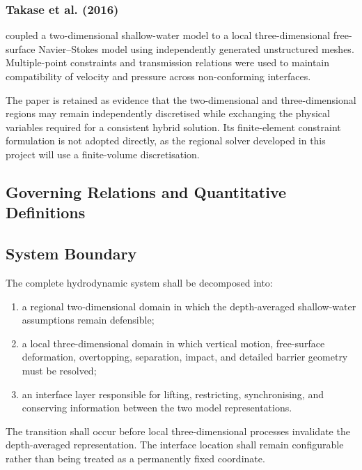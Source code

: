 \subsubsection{Takase et al. (2016)}
\label{sec:res-mod-mul-evidence-takase-2016}

\textcite{takase2016hybrid} coupled a two-dimensional shallow-water model to a local three-dimensional free-surface Navier--Stokes model using independently generated unstructured meshes. Multiple-point constraints and transmission relations were used to maintain compatibility of velocity and pressure across non-conforming interfaces.

The paper is retained as evidence that the two-dimensional and three-dimensional regions may remain independently discretised while exchanging the physical variables required for a consistent hybrid solution. Its finite-element constraint formulation is not adopted directly, as the regional solver developed in this project will use a finite-volume discretisation.

\subsection{Governing Relations and Quantitative Definitions}
\label{sec:res-mod-mul-governing-relations}

%

\subsection{System Boundary}
\label{sec:res-mod-mul-system-boundary}


The complete hydrodynamic system shall be decomposed into:
\begin{enumerate}
  \item a regional two-dimensional domain in which the depth-averaged shallow-water assumptions remain defensible;
  \item a local three-dimensional domain in which vertical motion, free-surface deformation, overtopping, separation, impact, and detailed barrier geometry must be resolved;
  \item an interface layer responsible for lifting, restricting, synchronising, and conserving information between the two model representations.
\end{enumerate}
The transition shall occur before local three-dimensional processes invalidate the depth-averaged representation. The interface location shall remain configurable rather than being treated as a permanently fixed coordinate.

